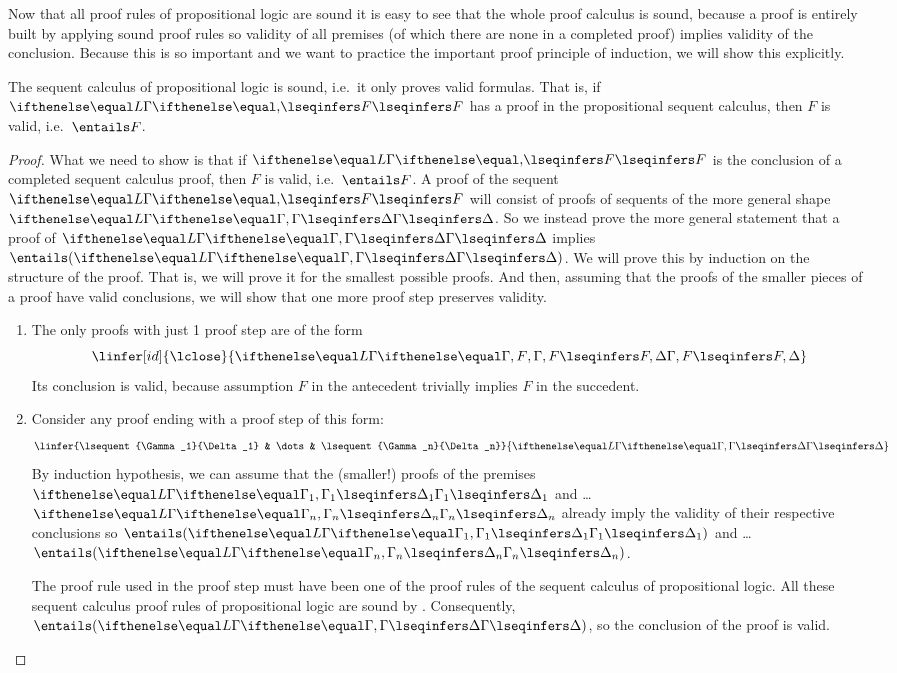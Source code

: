 \documentclass[11pt,twoside]{scrartcl}
\newcommand{\asfml}{F}
\begin{document}
Now that all proof rules of propositional logic are sound it is easy to see that the whole proof calculus is sound, because a proof is entirely built by applying sound proof rules so validity of all premises (of which there are none in a completed proof) implies validity of the conclusion.
Because this is so important and we want to practice the important proof principle of induction, we will show this explicitly.

\begin{theorem}
  The sequent calculus of propositional logic is sound, i.e.\ it only proves valid formulas.
  That is, if \(\lsequent{}{\asfml}\) has a proof in the propositional sequent calculus, then $\asfml$ is valid, i.e.\ \(\entails \asfml\).
\end{theorem}
\begin{proof}
What we need to show is that if \(\lsequent{}{\asfml}\) is the conclusion of a completed sequent calculus proof, then $\asfml$ is valid, i.e.\ \(\entails \asfml\).
A proof of the sequent \(\lsequent{}{\asfml}\) will consist of proofs of sequents of the more general shape \(\lsequent{\Gamma}{\Delta}\).
So we instead prove the more general statement that a proof of \(\lsequent{\Gamma}{\Delta}\) implies \(\entails (\lsequent{\Gamma}{\Delta})\).
We will prove this by induction on the structure of the proof.
That is, we will prove it for the smallest possible proofs.
And then, assuming that the proofs of the smaller pieces of a proof have valid conclusions, we will show that one more proof step preserves validity.
\begin{enumerate}
\item The only proofs with just 1 proof step are of the form
\[
\linfer[id]
{\lclose}
{\lsequent{\Gamma,\asfml}{\asfml,\Delta}}
\]
Its conclusion is valid, because assumption $\asfml$ in the antecedent trivially implies $\asfml$ in the succedent.

\item Consider any proof ending with a proof step of this form:
  \begin{equation}
  \linfer
  {\lsequent{\Gamma_1}{\Delta_1} & \dots & \lsequent{\Gamma_n}{\Delta_n}}
  {\lsequent{\Gamma}{\Delta}}
  \label{eq:aproofstep}
  \end{equation}
  By induction hypothesis, we can assume that the (smaller!) proofs of the premises \(\lsequent{\Gamma_1}{\Delta_1}\)  and \dots \(\lsequent{\Gamma_n}{\Delta_n}\) already imply the validity of their respective conclusions so \(\entails (\lsequent{\Gamma_1}{\Delta_1})\) and \dots \(\entails(\lsequent{\Gamma_n}{\Delta_n})\).
  
  The proof rule used in the proof step  must have been one of the proof rules of the sequent calculus of propositional logic.
  All these sequent calculus proof rules of propositional logic are sound by .
  Consequently, \(\entails (\lsequent{\Gamma}{\Delta})\),
  so the conclusion of the proof  is valid.
  \qedhere
\end{enumerate}
\end{proof}
\end{document}
